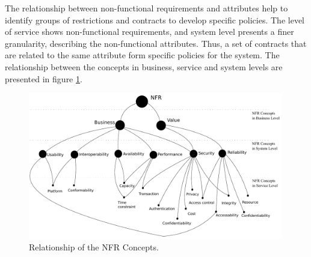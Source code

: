 The relationship between non-functional requirements and attributes help to
identify groups of restrictions and contracts to develop specific policies. The
level of service shows non-functional requirements, and system level presents a
finer granularity, describing the non-functional attributes. Thus, a set of
contracts that are related to the same attribute form specific policies for the
system. The relationship between the concepts in business, service and system
levels are presented in figure \ref{fig:nfr-relationship}.

\begin{figure}[ht!]  
\centering  
\includegraphics[width=0.99\textwidth]{chapters/state_ofthe_art/figs/nfrRelationship.pdf}
\caption{Relationship of the NFR Concepts.}
\label{fig:nfr-relationship}   
\end{figure}    
 
